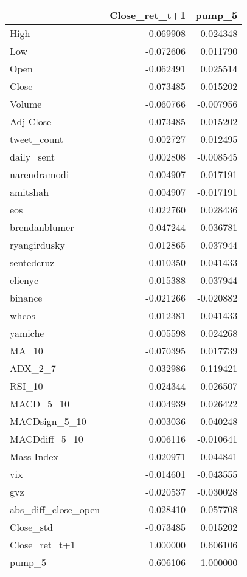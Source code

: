 \begin{tabular}{lrr}
\toprule
{} &  Close\_ret\_t+1 &    pump\_5 \\
\midrule
High                &      -0.069908 &  0.024348 \\
Low                 &      -0.072606 &  0.011790 \\
Open                &      -0.062491 &  0.025514 \\
Close               &      -0.073485 &  0.015202 \\
Volume              &      -0.060766 & -0.007956 \\
Adj Close           &      -0.073485 &  0.015202 \\
tweet\_count         &       0.002727 &  0.012495 \\
daily\_sent          &       0.002808 & -0.008545 \\
narendramodi        &       0.004907 & -0.017191 \\
amitshah            &       0.004907 & -0.017191 \\
eos                 &       0.022760 &  0.028436 \\
brendanblumer       &      -0.047244 & -0.036781 \\
ryangirdusky        &       0.012865 &  0.037944 \\
sentedcruz          &       0.010350 &  0.041433 \\
elienyc             &       0.015388 &  0.037944 \\
binance             &      -0.021266 & -0.020882 \\
whcos               &       0.012381 &  0.041433 \\
yamiche             &       0.005598 &  0.024268 \\
MA\_10               &      -0.070395 &  0.017739 \\
ADX\_2\_7             &      -0.032986 &  0.119421 \\
RSI\_10              &       0.024344 &  0.026507 \\
MACD\_5\_10           &       0.004939 &  0.026422 \\
MACDsign\_5\_10       &       0.003036 &  0.040248 \\
MACDdiff\_5\_10       &       0.006116 & -0.010641 \\
Mass Index          &      -0.020971 &  0.044841 \\
vix                 &      -0.014601 & -0.043555 \\
gvz                 &      -0.020537 & -0.030028 \\
abs\_diff\_close\_open &      -0.028410 &  0.057708 \\
Close\_std           &      -0.073485 &  0.015202 \\
Close\_ret\_t+1       &       1.000000 &  0.606106 \\
pump\_5              &       0.606106 &  1.000000 \\
\bottomrule
\end{tabular}
